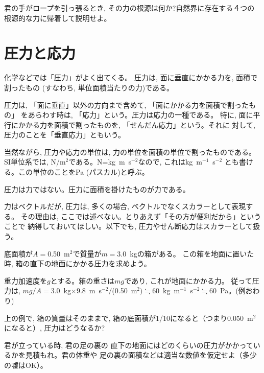 %
\begin{q}\label{q:force_rope5}
君の手がロープを引っ張るとき, その力の根源は何か?自然界に存在する４つの
根源的な力に帰着して説明せよ。
\end{q}
\hv



\section{圧力と応力}

化学などでは「圧力」がよく出てくる。
圧力は, 面に垂直にかかる力を, 面積で割ったもの
(すなわち, 単位面積当たりの力)である。

圧力は, 「面に垂直」以外の方向まで含めて, 「面にかかる力を面積で割ったもの」
をあらわす時は, 「応力」という。圧力は応力の一種である。
特に, 面に平行にかかる力を面積で割ったものを, 「せんだん応力」という。それに
対して, 圧力のことを「垂直応力」ともいう。

当然ながら, 圧力や応力の単位は, 力の単位を面積の単位で割ったものである。
SI単位系では, N/m$^{2}$である。N=kg~m~s$^{-2}$なので, これはkg~m$^{-1}$~s$^{-2}$
とも書ける。この単位のことをPa (パスカル)と呼ぶ。

圧力は力ではない。圧力に面積を掛けたものが力である。

力はベクトルだが, 圧力は, 多くの場合, ベクトルでなくスカラーとして表現する。
その理由は, ここでは述べない。とりあえず「その方が便利だから」ということで
納得しておいてほしい。以下でも, 圧力やせん断応力はスカラーとして扱う。

\begin{exmpl} 底面積が$A=$0.50~m$^2$で質量が$m=$3.0~kgの箱がある。
この箱を地面に置いた時, 箱の直下の地面にかかる圧力を求めよう。

重力加速度を$g$とする。箱の重さは$mg$であり, これが地面にかかる力。
従って圧力は, $mg/A=3.0$~kg$\times 9.8$~m~s$^{-2}/$(0.50~m$^2)\fallingdotseq 60$~kg~m$^{-1}$~s$^{-2}\fallingdotseq 60$~Pa。(例おわり)
\end{exmpl}

\begin{q} 上の例で, 箱の質量はそのままで, 
箱の底面積が1/10になると（つまり0.050~m$^2$になると）, 圧力はどうなるか?
\end{q}

\begin{q}\label{q:pressure_shoes} 君が立っている時, 君の足の裏の
直下の地面にはどのくらいの圧力がかかっているかを見積もれ。君の体重や
足の裏の面積などは適当な数値を仮定せよ（多少の嘘はOK）。
\end{q}

